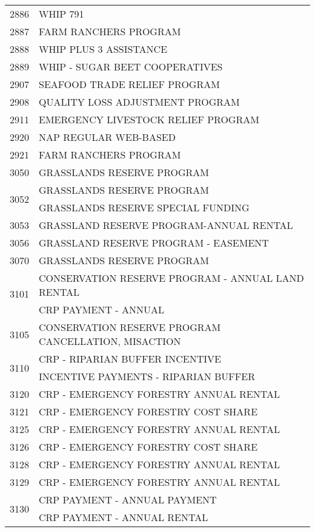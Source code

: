 \begin{longtable}{ll}
\cline{1-2}
2886 & WHIP 791 \\
\cline{1-2}
2887 & FARM RANCHERS PROGRAM \\
\cline{1-2}
2888 & WHIP PLUS 3 ASSISTANCE \\
\cline{1-2}
2889 & WHIP - SUGAR BEET COOPERATIVES \\
\cline{1-2}
2907 & SEAFOOD TRADE RELIEF PROGRAM \\
\cline{1-2}
2908 & QUALITY LOSS ADJUSTMENT PROGRAM \\
\cline{1-2}
2911 & EMERGENCY LIVESTOCK RELIEF PROGRAM \\
\cline{1-2}
2920 & NAP REGULAR WEB-BASED \\
\cline{1-2}
2921 & FARM RANCHERS PROGRAM \\
\cline{1-2}
3050 & GRASSLANDS RESERVE PROGRAM \\
\cline{1-2}
\multirow[t]{2}{*}{3052} & GRASSLANDS RESERVE PROGRAM \\
 & GRASSLANDS RESERVE SPECIAL FUNDING \\
\cline{1-2}
3053 & GRASSLAND RESERVE PROGRAM-ANNUAL RENTAL \\
\cline{1-2}
3056 & GRASSLAND RESERVE PROGRAM - EASEMENT \\
\cline{1-2}
3070 & GRASSLANDS RESERVE PROGRAM \\
\cline{1-2}
\multirow[t]{2}{*}{3101} & CONSERVATION RESERVE PROGRAM - ANNUAL LAND RENTAL \\
 & CRP PAYMENT - ANNUAL \\
\cline{1-2}
3105 & CONSERVATION RESERVE PROGRAM CANCELLATION, MISACTION \\
\cline{1-2}
\multirow[t]{2}{*}{3110} & CRP - RIPARIAN BUFFER INCENTIVE \\
 & INCENTIVE PAYMENTS - RIPARIAN BUFFER \\
\cline{1-2}
3120 & CRP - EMERGENCY FORESTRY ANNUAL RENTAL \\
\cline{1-2}
3121 & CRP - EMERGENCY FORESTRY COST SHARE \\
\cline{1-2}
3125 & CRP - EMERGENCY FORESTRY ANNUAL RENTAL \\
\cline{1-2}
3126 & CRP - EMERGENCY FORESTRY COST SHARE \\
\cline{1-2}
3128 & CRP - EMERGENCY FORESTRY ANNUAL RENTAL \\
\cline{1-2}
3129 & CRP - EMERGENCY FORESTRY ANNUAL RENTAL \\
\cline{1-2}
\multirow[t]{2}{*}{3130} & CRP PAYMENT - ANNUAL PAYMENT \\
 & CRP PAYMENT - ANNUAL RENTAL \\

\end{longtable}
